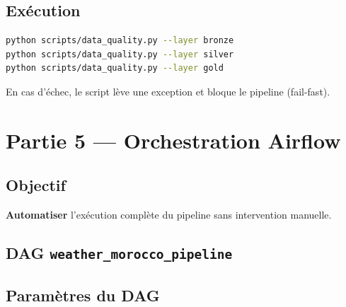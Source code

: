 \documentclass[12pt,a4paper]{report}
\begin{document}
\section{Exécution}

\begin{lstlisting}[language=bash]
python scripts/data_quality.py --layer bronze
python scripts/data_quality.py --layer silver
python scripts/data_quality.py --layer gold
\end{lstlisting}

En cas d'échec, le script lève une exception et bloque le pipeline (fail-fast).

\chapter{Partie 5 — Orchestration Airflow}

\section{Objectif}

\textbf{Automatiser} l'exécution complète du pipeline sans intervention manuelle.

\section{DAG \texttt{weather\_morocco\_pipeline}}

\begin{center}
\end{center}

\section{Paramètres du DAG}
\end{document}
